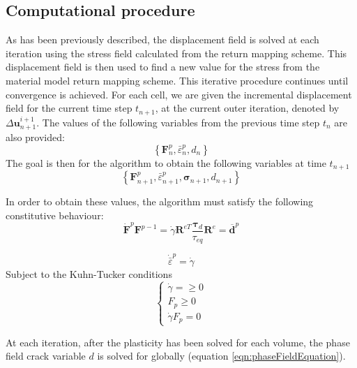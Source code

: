 \documentclass[sn-mathphys,Numbered,draft]{sn-jnl}%
\begin{document}
\subsection{Computational procedure}

As has been previously described, the displacement field is solved at each iteration using the stress field calculated from the return mapping scheme. This displacement field is then used to find a new value for the stress from the material model return mapping scheme. This iterative procedure continues until convergence is achieved. For each cell, we are given the incremental displacement field for the current time step $t_{n+1}$, at the current outer iteration, denoted by $\Delta \mathbf{u}_{n+1}^{i+1}$. The values of the following variables from the previous time step $t_{n}$ are also provided:
\begin{equation}
\left\{\mathbf{F}_n^p, \bar{\varepsilon}^p_n, d_n\right\}
\end{equation}
The goal is then for the algorithm to obtain the following variables at time $t_{n+1}$
\begin{equation}
\left\{\mathbf{F}_{n+1}^p, \bar{\varepsilon}^p_{n+1},\boldsymbol{\sigma}_{n+1}, d_{n+1}\right\}
\end{equation}

In order to obtain these values, the algorithm must satisfy the following constitutive behaviour:
\begin{equation}
\dot{\boldsymbol{F}}^p \boldsymbol{F}^{p-1}=\dot{\gamma} \boldsymbol{R}^{e T} \frac{\boldsymbol{\tau}_d}{\tau_{eq}} \boldsymbol{R}^e=\overline{\boldsymbol{d}}^p 
\end{equation}

\begin{equation}
\dot{\bar{\varepsilon}}^p=\dot{\gamma}
\end{equation}
Subject to the Kuhn-Tucker conditions 
\begin{equation}
\left\{\begin{array}{c}
\dot{\gamma}=\geq 0 \\
F_p\geq 0 \\
\dot{\gamma}F_p=0
\end{array}\right.
\end{equation}

At each iteration, after the plasticity has been solved for each volume, the phase field crack variable $d$ is solved for globally (equation \ref{eqn:phaseFieldEquation}).
\end{document}
